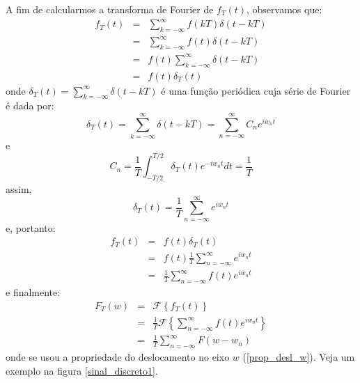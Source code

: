 A fim de calcularmos a transforma de Fourier de $f_T(t)$, observamos que:
\begin{eqnarray*}
f_T(t)&=&\sum_{k=-\infty}^\infty f(kT) \delta (t-kT)\\
&=&\sum_{k=-\infty}^\infty f(t) \delta (t-kT)\\
&=&f(t)\sum_{k=-\infty}^\infty \delta (t-kT)\\
&=&f(t)\delta_T(t)
\end{eqnarray*}
onde $\delta_T(t)=\sum_{k=-\infty}^\infty \delta (t-kT)$ é uma função periódica cuja série de Fourier é dada por:
$$\delta_T(t)=\sum_{k=-\infty}^\infty \delta (t-kT)=\sum_{n=-\infty}^\infty C_n e^{iw_n t}$$
e
$$C_n=\frac{1}{T}\int_{-T/2}^{T/2}\delta_T(t) e^{-iw_n t}dt=\frac{1}{T}$$
assim,
$$\delta_T(t)=\frac{1}{T}\sum_{n=-\infty}^\infty  e^{iw_n t}$$
e, portanto:
\begin{eqnarray*}
f_T(t)&=&f(t)\delta_T(t)\\
&=& f(t)\frac{1}{T}\sum_{n=-\infty}^\infty  e^{iw_n t}\\
&=&\frac{1}{T}\sum_{n=-\infty}^\infty f(t) e^{iw_n t}
\end{eqnarray*}
e finalmente:
\begin{eqnarray*}
F_T(w)&=&\mathcal{F}\left\{f_T(t)\right\}\\
&=&\frac{1}{T}\mathcal{F}\left\{\sum_{n=-\infty}^\infty f(t) e^{iw_n t}\right\}\\
&=&\frac{1}{T}\sum_{n=-\infty}^\infty F(w-w_n)
\end{eqnarray*}
onde se usou a propriedade do deslocamento no eixo $w$ (\ref{prop_desl_w}). Veja um exemplo na figura \ref{sinal_discreto1}.
